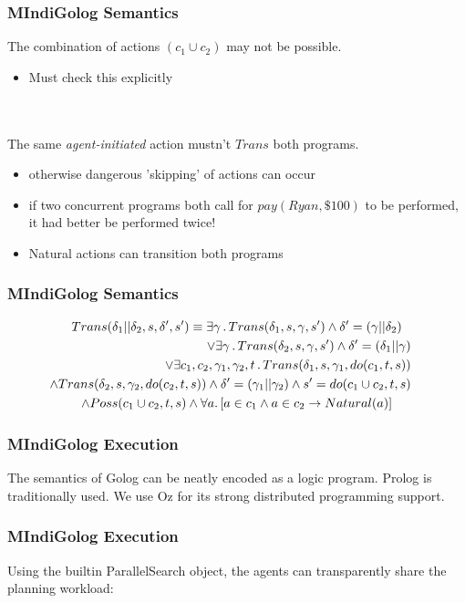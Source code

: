 \documentclass{beamer}
\begin{document}
\begin{frame}
\frametitle{MIndiGolog Semantics}
The combination of actions $(c_1\cup c_2)$ may not be possible.
\begin{itemize}
  \item Must check this explicitly
\end{itemize}
\ \\
\ \\
The same \emph{agent-initiated} action mustn't $Trans$ both programs.
\begin{itemize}
  \item otherwise dangerous 'skipping' of actions can occur
  \item if two concurrent programs both call for $pay(Ryan,\$100)$ to be performed, it had better be performed twice!
  \item Natural actions can transition both programs
\end{itemize}
\end{frame}

\begin{frame}
\frametitle{MIndiGolog Semantics}
\begin{multline*}
Trans(\delta_{1}||\delta_{2},s,\delta',s')\equiv\exists\gamma\,.\, Trans(\delta_{1},s,\gamma,s')\wedge\delta'=(\gamma||\delta_{2})\\
\shoveright{\vee\exists\gamma\,.\, Trans(\delta_{2},s,\gamma,s')\wedge\delta'=(\delta_{1}||\gamma)}\\
\shoveright{\vee\exists c_{1},c_{2},\gamma_{1},\gamma_{2},t\,.\, Trans(\delta_{1},s,\gamma_{1},do(c_{1},t,s))}\\
\shoveright{\wedge Trans(\delta_{2},s,\gamma_{2},do(c_{2},t,s))\wedge\delta'=(\gamma_1||\gamma_2)\wedge s'=do(c_1\cup c_2,t,s)}\\
\wedge Poss(c_1\cup c_2,t,s)\wedge\forall a.\left[a\in c_{1}\wedge a\in c_{2}\rightarrow Natural(a)\right]
\end{multline*}
\end{frame}

\begin{frame}
\frametitle{MIndiGolog Execution}
The semantics of Golog can be neatly encoded as a logic program.
Prolog is traditionally used.
We use Oz for its strong distributed programming support.


\end{frame}

\begin{frame}
\frametitle{MIndiGolog Execution}
Using the builtin ParallelSearch object, the agents can transparently
share the planning workload:


\end{frame}
\end{document}
